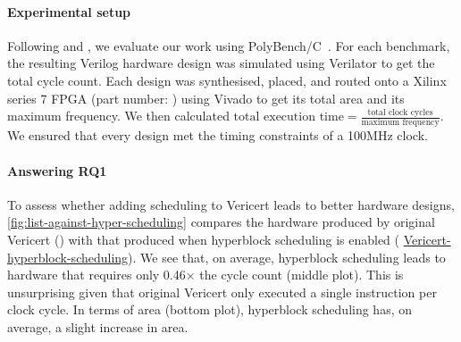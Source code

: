 \newcommand\VericertList{%
\setul{-1pt}{3pt}\setulcolor{colorVericertListLIGHT}%
{\ul{\textsf{Vericert-list-scheduling}}}}

\newcommand\VericertHyper{%
\setul{-1pt}{3pt}\setulcolor{colorVericertHyperLIGHT}%
{\ul{\textsf{Vericert-hyperblock-scheduling}}}}

\begin{figure*}
  \centering
  \resizebox{\linewidth}{!}{}
  \caption[Results of simulating and synthesising the PolyBench/C benchmark suite using a range of HLS tools. All figures are relative to Bambu.]{Results of simulating and synthesising the PolyBench/C benchmark suite using a range of HLS tools. All figures are relative to \BambuDefault{}.}%
  \label{fig:list-against-hyper-scheduling}
\end{figure*}

\paragraph{Experimental setup}
Following \textcite{herklotz21_formal_verif_high_level_synth} and \textcite{six22_formal_verif_super_sched}, we evaluate our work using PolyBench/C~\cite{pouchet20_polyb_c}. For each benchmark, the resulting Verilog hardware design was simulated using Verilator to get the total cycle count. Each design was synthesised, placed, and routed onto a Xilinx series 7 FPGA (part number: ) using Vivado to get its total area and its maximum frequency.
We then calculated $\text{total execution time} = \frac{\text{total clock cycles}}{\text{maximum frequency}}$.  We ensured that every design met the timing constraints of a 100MHz clock.

\paragraph{Answering RQ1}
To assess whether adding scheduling to Vericert leads to better hardware designs, \cref{fig:list-against-hyper-scheduling} compares the hardware produced by original Vericert (\VericertBase{}) with that produced when hyperblock scheduling is enabled (\VericertHyper{}). We see that, on average, hyperblock scheduling leads to hardware that requires only 0.46$\times$ the cycle count (middle plot). This is unsurprising given that original Vericert only executed a single instruction per clock cycle. In terms of area (bottom plot), hyperblock scheduling has, on average, a slight increase in area.

